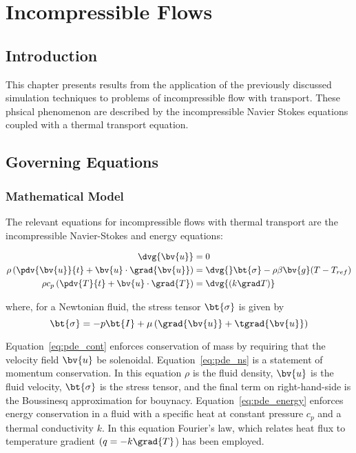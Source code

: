 \chapter{Incompressible Flows\label{chap:incompressible}}

\section{Introduction}
This chapter presents results from the application of the previously discussed simulation techniques to problems of incompressible flow with transport.  These phsical phenomenon are described by the incompressible Navier Stokes equations coupled with a thermal transport equation.

\section{Governing Equations}

\subsection{Mathematical Model}
The relevant equations for incompressible flows with thermal transport are the incompressible Navier-Stokes and energy equations:

\begin{align}
  \label{eq:pde_cont}
  \dvg{\bv{u}} &= 0 \\
  \label{eq:pde_ns}
  \rho\left(\pdv{\bv{u}}{t} + \bv{u}\cdot\grad{\bv{u}}\right) &= \dvg{}\bt{\sigma} -\rho\beta\bv{g}(T-T_{ref}) \\
  \label{eq:pde_energy}
  \rho c_p \left(\pdv{T}{t} + \bv{u}\cdot\grad{T}\right) &= \dvg{(k\grad T)}
\end{align}

where, for a Newtonian fluid, the stress tensor $\bt{\sigma}$ is given by
\begin{equation}
  \label{eq:sigma1}
  \bt{\sigma} = -p\bt{I} + \mu\left(\grad{\bv{u}} + \tgrad{\bv{u}}\right)
\end{equation}


Equation~\eqref{eq:pde_cont} enforces conservation of mass by requiring that the velocity field $\bv{u}$ be solenoidal.  Equation~\eqref{eq:pde_ns} is a statement of momentum conservation.  In this equation $\rho$ is the fluid density, $\bv{u}$ is the fluid velocity, $\bt{\sigma}$ is the stress tensor, and the final term on right-hand-side is the Boussinesq approximation for bouynacy.  Equation~\eqref{eq:pde_energy} enforces energy conservation in a fluid with a specific heat at constant pressure $c_p$ and a thermal conductivity $k$.  In this equation Fourier's law, which relates heat flux to temperature gradient $(q=-k\grad{T}$) has been employed.


